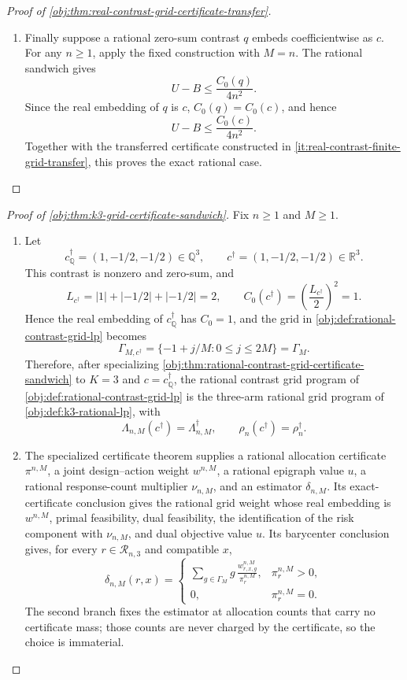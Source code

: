 \begin{proof}[Proof of \cref{obj:thm:real-contrast-grid-certificate-transfer}]
\begin{enumerate}
\item Finally suppose a rational zero-sum contrast \(q\) embeds coefficientwise as \(c\).  For any \(n\ge1\), apply the fixed construction with \(M=n\).  The rational sandwich gives
\[
U-B\le \frac{C_0(q)}{4n^2}.
\]
Since the real embedding of \(q\) is \(c\), \(C_0(q)=C_0(c)\), and hence
\[
U-B\le \frac{C_0(c)}{4n^2}.
\]
Together with the transferred certificate constructed in \cref{it:real-contrast-finite-grid-transfer}, this proves the exact rational case. %
\end{enumerate}
\end{proof}

\begin{proof}[Proof of \cref{obj:thm:k3-grid-certificate-sandwich}]
Fix \(n\geq 1\) and \(M\geq 1\).
\begin{enumerate}
\item Let
\[
c_{\mathbb Q}^\dagger=(1,-1/2,-1/2)\in\mathbb Q^3,
\qquad
c^\dagger=(1,-1/2,-1/2)\in\mathbb R^3 .
\]
This contrast is nonzero and zero-sum, and
\[
L_{c^\dagger}=|1|+|-1/2|+|-1/2|=2,
\qquad
C_0(c^\dagger)=\left(\frac{L_{c^\dagger}}2\right)^2=1 .
\]
Hence the real embedding of \(c_{\mathbb Q}^\dagger\) has \(C_0=1\), and the grid in \cref{obj:def:rational-contrast-grid-lp} becomes
\[
\Gamma_{M,c^\dagger}
=
\{-1+j/M:0\leq j\leq 2M\}
=
\Gamma_M .
\]
Therefore, after specializing \cref{obj:thm:rational-contrast-grid-certificate-sandwich} to \(K=3\) and \(c=c_{\mathbb Q}^\dagger\), the rational contrast grid program of \cref{obj:def:rational-contrast-grid-lp} is the three-arm rational grid program of \cref{obj:def:k3-rational-lp}, with
\[
\Lambda_{n,M}(c^\dagger)=\Lambda_{n,M}^\dagger,
\qquad
\rho_n(c^\dagger)=\rho_n^\dagger .
\]

\item The specialized certificate theorem supplies a rational allocation certificate \(\pi^{n,M}\), a joint design--action weight \(w^{n,M}\), a rational epigraph value \(u\), a rational response-count multiplier \(\nu_{n,M}\), and an estimator \(\delta_{n,M}\). Its exact-certificate conclusion gives the rational grid weight whose real embedding is \(w^{n,M}\), primal feasibility, dual feasibility, the identification of the risk component with \(\nu_{n,M}\), and dual objective value \(u\). Its barycenter conclusion gives, for every \(r\in\mathcal R_{n,3}\) and compatible \(x\),
\[
\delta_{n,M}(r,x)
=
\begin{cases}
\displaystyle
\sum_{g\in\Gamma_M}g\,\frac{w_{r,x,g}^{n,M}}{\pi_r^{n,M}},
& \pi_r^{n,M}>0,\\[1ex]
0,& \pi_r^{n,M}=0.
\end{cases}
\]
The second branch fixes the estimator at allocation counts that carry no certificate mass; those counts are never charged by the certificate, so the choice is immaterial.


\end{enumerate}
\end{proof}
